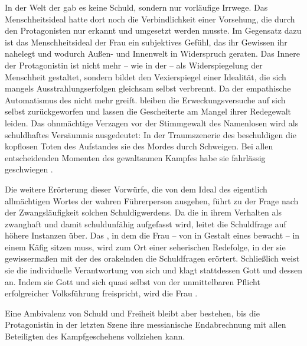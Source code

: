 In der Welt der \Cite{Wandlung} gab es keine Schuld, sondern nur vorläufige
Irrwege. Das Menschheitsideal hatte dort noch die Verbindlichkeit einer
Vorsehung, die durch den Protagonisten nur erkannt und umgesetzt werden
musste. Im Gegensatz dazu ist das Menschheitsideal der Frau ein subjektives
Gefühl, das ihr Gewissen ihr nahelegt und wodurch Außen- und Innenwelt in
Widerspruch geraten. Das Innere der Protagonistin ist nicht
mehr -- wie in der  -- als Widerspiegelung der Menschheit
gestaltet, sondern bildet den Vexierspiegel einer 
Idealität, die sich mangels Ausstrahlungserfolgen gleichsam selbst verbrennt.   
Da der empathische Automatismus des \Cite{Ich weiß um euch} nicht mehr greift.
bleiben die Erweckungsversuche auf sich selbst zurückgeworfen und lassen die
Gescheiterte am Mangel ihrer Redegewalt leiden. Das ohnmächtige Verzagen vor
der Stimmgewalt des Namenlosen wird als schuldhaftes Versäumnis ausgedeutet:
In der Traumszenerie des \Cite{Menschenschauhauses} beschuldigen die
kopflosen Toten des Aufstandes sie des Mordes durch Schweigen. Bei allen
entscheidenden Momenten des gewaltsamen Kampfes habe sie 
fahrlässig geschwiegen .

Die weitere Erörterung dieser Vorwürfe, die von dem Ideal des
eigentlich allmächtigen Wortes der wahren Führerperson ausgehen, führt zu der Frage
nach der Zwangsläufigkeit solchen Schuldigwerdens. Da die \Cite{Masse} in ihrem
Verhalten als zwanghaft und damit schuldunfähig aufgefasst wird, leitet die
Schuldfrage auf höhere Instanzen über. Das \Cite{Menschenschauhaus}, in dem 
die Frau -- von \Cite{dem Begleiter} in Gestalt eines \Cite{Wärters} 
bewacht -- in einem Käfig sitzen muss, wird zum Ort einer seherischen Redefolge, in der
sie gewissermaßen mit der  des orakelnden
\Cite{Begleiters} die Schuldfragen erörtert. Schließlich weist sie die
individuelle Verantwortung von sich und klagt stattdessen Gott und dessen
\Cite{ungeheuerlich Gesetz der Schuld}  an.
Indem sie Gott \Cite{überwindet} und sich quasi selbst von der
unmittelbaren Pflicht erfolgreicher Volksführung freispricht, wird die Frau
\Cite{geheilt}.

Eine Ambivalenz von \Cite{schuldloser} Schuld  und
\Cite{unfreier} Freiheit  bleibt aber bestehen, bis die
Protagonistin in der letzten
Szene ihre messianische Endabrechnung mit allen Beteiligten des
Kampfgeschehens vollziehen kann.

